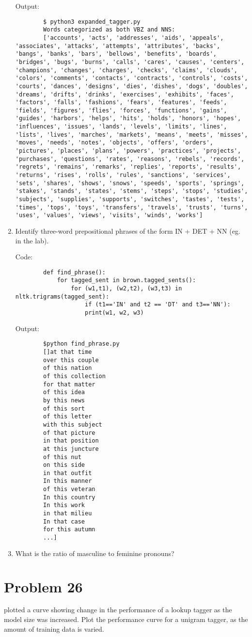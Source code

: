 \documentclass[12pt]{article}
\begin{document}
\begin{enumerate}
		Output:
		\begin{lstlisting}
		$ python3 expanded_tagger.py
		Words categorized as both VBZ and NNS:
		['accounts', 'acts', 'addresses', 'aids', 'appeals', 'associates', 'attacks', 'attempts', 'attributes', 'backs', 'bangs', 'banks', 'bars', 'bellows', 'benefits', 'boards', 'bridges', 'bugs', 'burns', 'calls', 'cares', 'causes', 'centers', 'champions', 'changes', 'charges', 'checks', 'claims', 'clouds', 'colors', 'comments', 'contacts', 'contracts', 'controls', 'costs', 'courts', 'dances', 'designs', 'dies', 'dishes', 'dogs', 'doubles', 'dreams', 'drifts', 'drinks', 'exercises', 'exhibits', 'faces', 'factors', 'falls', 'fashions', 'fears', 'features', 'feeds', 'fields', 'figures', 'flies', 'forces', 'functions', 'gains', 'guides', 'harbors', 'helps', 'hits', 'holds', 'honors', 'hopes', 'influences', 'issues', 'lands', 'levels', 'limits', 'lines', 'lists', 'lives', 'marches', 'markets', 'means', 'meets', 'misses', 'moves', 'needs', 'notes', 'objects', 'offers', 'orders', 'pictures', 'places', 'plans', 'powers', 'practices', 'projects', 'purchases', 'questions', 'rates', 'reasons', 'rebels', 'records', 'regrets', 'remains', 'remarks', 'replies', 'reports', 'results', 'returns', 'rises', 'rolls', 'rules', 'sanctions', 'services', 'sets', 'shares', 'shows', 'snows', 'speeds', 'sports', 'springs', 'stakes', 'stands', 'states', 'stems', 'steps', 'stops', 'studies', 'subjects', 'supplies', 'supports', 'switches', 'tastes', 'tests', 'times', 'tops', 'toys', 'transfers', 'travels', 'trusts', 'turns', 'uses', 'values', 'views', 'visits', 'winds', 'works']
		\end{lstlisting}
		
		\item Identify three-word prepositional phrases of the form IN + DET + NN (eg. in the lab).
		
		Code:
		\begin{lstlisting}
		def find_phrase():
			for tagged_sent in brown.tagged_sents():
				for (w1,t1), (w2,t2), (w3,t3) in nltk.trigrams(tagged_sent):
					if (t1=='IN' and t2 == 'DT' and t3=='NN'):
					print(w1, w2, w3)
		\end{lstlisting}
		
		Output:
		\begin{lstlisting}
		$python find_phrase.py
		[]at that time
		over this couple
		of this nation
		of this collection
		for that matter
		of this idea
		by this news
		of this sort
		of this letter
		with this subject
		of that picture
		in that position
		at this juncture
		of this nut
		on this side
		in that outfit
		In this manner
		of this veteran
		In this country
		In this work
		in that milieu
		In that case
		for this autumn
		...]
		\end{lstlisting}
		
		\item What is the ratio of masculine to feminine pronouns?
		
	\end{enumerate}
	
	
	\section*{Problem 26}
	  plotted a curve showing change in the performance of a lookup tagger as the model size was increased. Plot the performance curve for a unigram tagger, as the amount of training data is varied.
	
\end{document}
